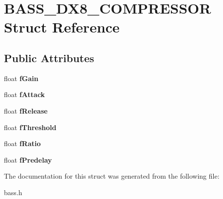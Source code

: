 \hypertarget{structBASS__DX8__COMPRESSOR}{}\section{B\+A\+S\+S\+\_\+\+D\+X8\+\_\+\+C\+O\+M\+P\+R\+E\+S\+S\+O\+R Struct Reference}
\label{structBASS__DX8__COMPRESSOR}
\subsection*{Public Attributes}
\begin{DoxyCompactItemize}
\item 
\hypertarget{structBASS__DX8__COMPRESSOR_a9d35e7c7ad2df73b081f31ceee1defcc}{}float {\bfseries f\+Gain}\label{structBASS__DX8__COMPRESSOR_a9d35e7c7ad2df73b081f31ceee1defcc}

\item 
\hypertarget{structBASS__DX8__COMPRESSOR_a7ad66e4cd902035feff1050abeaf7f35}{}float {\bfseries f\+Attack}\label{structBASS__DX8__COMPRESSOR_a7ad66e4cd902035feff1050abeaf7f35}

\item 
\hypertarget{structBASS__DX8__COMPRESSOR_a342f2aac54617c7cedb1cef24e504859}{}float {\bfseries f\+Release}\label{structBASS__DX8__COMPRESSOR_a342f2aac54617c7cedb1cef24e504859}

\item 
\hypertarget{structBASS__DX8__COMPRESSOR_a16e3551549e24df55d0f97cb7d67f048}{}float {\bfseries f\+Threshold}\label{structBASS__DX8__COMPRESSOR_a16e3551549e24df55d0f97cb7d67f048}

\item 
\hypertarget{structBASS__DX8__COMPRESSOR_adb827cf9d2693779c096cf22761ace59}{}float {\bfseries f\+Ratio}\label{structBASS__DX8__COMPRESSOR_adb827cf9d2693779c096cf22761ace59}

\item 
\hypertarget{structBASS__DX8__COMPRESSOR_adeacc7ea3f0433fc478b91943a0a695d}{}float {\bfseries f\+Predelay}\label{structBASS__DX8__COMPRESSOR_adeacc7ea3f0433fc478b91943a0a695d}

\end{DoxyCompactItemize}


The documentation for this struct was generated from the following file\+:\begin{DoxyCompactItemize}
\item 
bass.\+h\end{DoxyCompactItemize}
